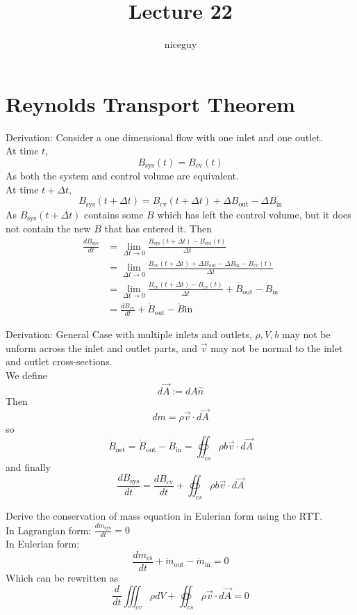 \documentclass[12pt]{article}
\author{niceguy}
\title{Lecture 22}
\begin{document}
\maketitle

\section{Reynolds Transport Theorem}

Derivation: Consider a one dimensional flow with one inlet and one outlet. \\
At time $t$,
$$B_\mathrm{sys}(t) = B_\mathrm{cv}(t)$$
As both the system and control volume are equivalent. \\
At time $t+\Delta t$,
$$B_\mathrm{sys}(t+\Delta t) = B_\mathrm{cv}(t+\Delta t) + \Delta B_\mathrm{out} - \Delta B_\mathrm{in}$$
As $B_\mathrm{sys}(t+\Delta t)$ contains some $B$ which has left the control volume, but it does not contain the new $B$ that has entered it. Then
\begin{align*}
	\frac{dB_\mathrm{sys}}{dt} &= \lim_{\Delta t \rightarrow 0} \frac{B_\mathrm{sys}(t+\Delta t) - B_\mathrm{sys}(t)}{\Delta t} \\
				   &= \lim_{\Delta t \rightarrow 0} \frac{B_\mathrm{cv}(t+\Delta t) + \Delta B_\mathrm{out} - \Delta B_\mathrm{in} - B_\mathrm{cv}(t)}{\Delta t} \\
				   &= \lim_{\Delta t \rightarrow 0} \frac{B_\mathrm{cv}(t+\Delta t)-B_\mathrm{cv}(t)}{\Delta t} + \dot{B}_\mathrm{out} - \dot{B}_\mathrm{in} \\
				   &= \frac{dB_\mathrm{cv}}{dt} + \dot{B}_\mathrm{out} - \dot{B}\mathrm{in}
\end{align*}

Derivation: General Case with multiple inlets and outlets, $\rho, V, b$ may not be unform across the inlet and outlet parts, and $\vec{v}$ may not be normal to the inlet and outlet cross-sections. \\
We define
$$d\vec{A} := dA\hat{n}$$
Then
$$dm = \rho\vec{v}\cdot d\vec{A}$$
so
$$\dot{B}_\mathrm{net} = \dot{B}_\mathrm{out} - \dot{B}_\mathrm{in} = \oiint_{cs} \rho b\vec{v}\cdot d\vec{A}$$
and finally
$$\frac{dB_\mathrm{sys}}{dt} = \frac{dB_\mathrm{cv}}{dt} + \oiint_{cs}\rho b\vec{v}\cdot d\vec{A}$$

\begin{ex}
	Derive the conservation of mass equation in Eulerian form using the RTT. \\
	In Lagrangian form: $\frac{dm_\mathrm{sys}}{dt} = 0$ \\
	In Eulerian form:
	$$\frac{dm_\mathrm{cs}}{dt} + \dot{m}_\mathrm{out}-\dot{m}_\mathrm{in} = 0$$
	Which can be rewritten as
	$$\frac{d}{dt} \iiint_{cv}\rho dV + \oiint_{cs}\rho\vec{v}\cdot d\vec{A} = 0$$
\end{ex}
\end{document}
